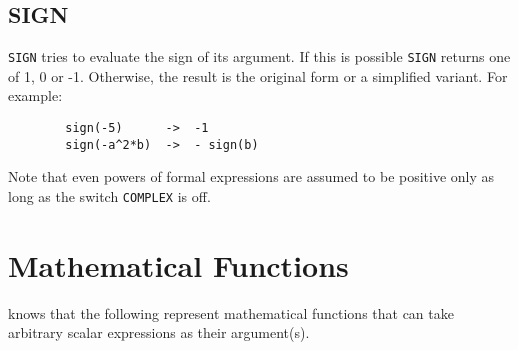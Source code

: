 \subsection{SIGN}
\hypertarget{operator:SIGN}{}
\texttt{SIGN} tries to evaluate the sign of its argument. If this
is possible \texttt{SIGN} returns one of 1, 0 or -1.  Otherwise, the result
is the original form or a simplified variant. For example:
\begin{verbatim}
        sign(-5)      ->  -1
        sign(-a^2*b)  ->  - sign(b)
\end{verbatim}
Note that even powers of formal expressions are assumed to be
positive only as long as the switch \texttt{COMPLEX} is off.

\section{Mathematical Functions}
\hypertarget{operator:ACOS}{}
\hypertarget{operator:ACOSH}{}
\hypertarget{operator:ACOT}{}
\hypertarget{operator:ACOTH}{}
\hypertarget{operator:ACSC}{}
\hypertarget{operator:ACSCH}{}
\hypertarget{operator:ASEC}{}
\hypertarget{operator:ASECH}{}
\hypertarget{operator:ASIN}{}
\hypertarget{operator:ASINH}{}
\hypertarget{operator:ATAN}{}
\hypertarget{operator:ATANH}{}
\hypertarget{operator:ATAN2}{}
\hypertarget{operator:COS}{}
\hypertarget{operator:COSH}{}
\hypertarget{operator:COT}{}
\hypertarget{operator:COTH}{}
\hypertarget{operator:CSC}{}
\hypertarget{operator:CSCH}{}
\hypertarget{operator:EXP}{}
\hypertarget{operator:HYPOT}{}
\hypertarget{operator:LOG}{}
\hypertarget{operator:LOGB}{}
\hypertarget{operator:LOG10}{}
\hypertarget{operator:SEC}{}
\hypertarget{operator:SECH}{}
\hypertarget{operator:SIN}{}
\hypertarget{operator:SINH}{}
\hypertarget{operator:SQRT}{}
\hypertarget{operator:TAN}{}
\hypertarget{operator:TANH}{}

{\REDUCE} knows that the following represent mathematical functions
 that can
take arbitrary scalar expressions as their argument(s).

